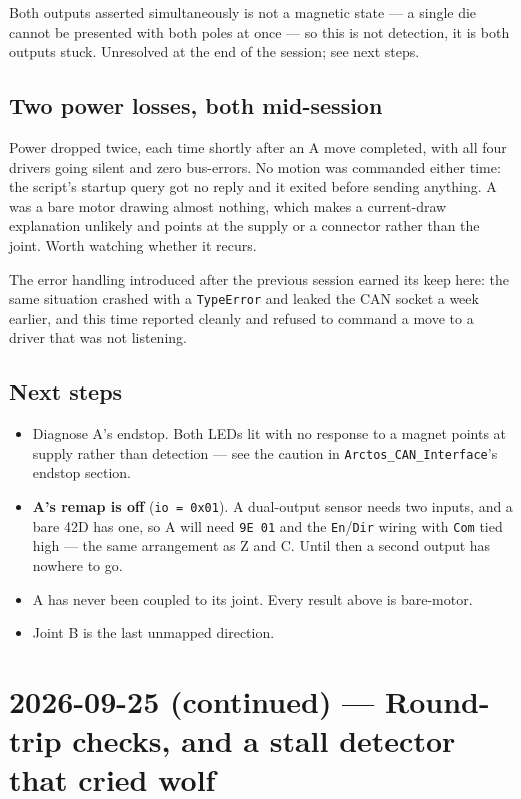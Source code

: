 \documentclass[11pt,letterpaper]{article}
\begin{document}
Both outputs asserted simultaneously is not a magnetic state --- a single die
cannot be presented with both poles at once --- so this is not detection, it is
both outputs stuck. Unresolved at the end of the session; see next steps.

\subsection{Two power losses, both mid-session}
Power dropped twice, each time shortly after an A move completed, with all four
drivers going silent and zero bus-errors. No motion was commanded either time:
the script's startup query got no reply and it exited before sending anything.
A was a bare motor drawing almost nothing, which makes a current-draw explanation
unlikely and points at the supply or a connector rather than the joint. Worth
watching whether it recurs.

The error handling introduced after the previous session earned its keep here:
the same situation crashed with a \texttt{TypeError} and leaked the CAN socket a
week earlier, and this time reported cleanly and refused to command a move to a
driver that was not listening.

\subsection{Next steps}
\begin{itemize}
    \item Diagnose A's endstop. Both LEDs lit with no response to a magnet points
    at supply rather than detection --- see the caution in
    \texttt{Arctos\_CAN\_Interface}'s endstop section.
    \item \textbf{A's remap is off} (\texttt{io = 0x01}). A dual-output sensor
    needs two inputs, and a bare 42D has one, so A will need \texttt{9E 01} and
    the \texttt{En}/\texttt{Dir} wiring with \texttt{Com} tied high --- the same
    arrangement as Z and C. Until then a second output has nowhere to go.
    \item A has never been coupled to its joint. Every result above is
    bare-motor.
    \item Joint B is the last unmapped direction.
\end{itemize}

\section{2026-09-25 (continued) --- Round-trip checks, and a stall detector that cried wolf}
\label{sec:session-2026-09-25b}
\end{document}
